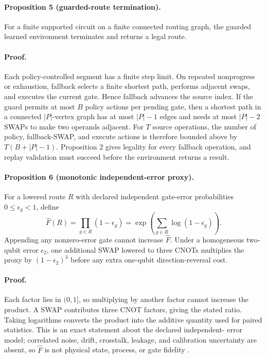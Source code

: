 \documentclass[conference]{IEEEtran}
\begin{document}
\paragraph{Proposition 5 (guarded-route termination).}
For a finite supported circuit on a finite connected routing graph, the
guarded learned environment terminates and returns a legal route.

\paragraph{Proof.}
Each policy-controlled segment has a finite step limit. On repeated
nonprogress or exhaustion, fallback selects a finite shortest path, performs
adjacent swaps, and executes the current gate. Hence fallback advances the
source index. If the guard permits at most $B$ policy actions per pending gate,
then a shortest path in a connected $|P|$-vertex graph has at most $|P|-1$
edges and needs at most $|P|-2$ SWAPs to make two operands adjacent. For $T$
source operations, the number of policy, fallback-SWAP, and execute actions is
therefore bounded above by $T(B+|P|-1)$. Proposition 2 gives legality for every
fallback operation, and replay validation must succeed before the environment
returns a result.

\paragraph{Proposition 6 (monotonic independent-error proxy).}
For a lowered route $R$ with declared independent gate-error probabilities
$0\leq\epsilon_g<1$, define
{\large
\begin{equation}
 \widehat F(R)=\prod_{g\in R}(1-\epsilon_g)
 =\exp\!\left(\sum_{g\in R}\log(1-\epsilon_g)\right).
 \label{eq:fidelity-proxy}
\end{equation}
}
Appending any nonzero-error gate cannot increase $\widehat F$. Under a
homogeneous two-qubit error $\epsilon_2$, one additional SWAP lowered to three
CNOTs multiplies the proxy by $(1-\epsilon_2)^3$ before any extra one-qubit
direction-reversal cost.

\paragraph{Proof.}
Each factor lies in $(0,1]$, so multiplying by another factor cannot increase
the product. A SWAP contributes three CNOT factors, giving the stated ratio.
Taking logarithms converts the product into the additive quantity used for
paired statistics. This is an exact statement about the declared independent-
error model; correlated noise, drift, crosstalk, leakage, and calibration
uncertainty are absent, so $\widehat F$ is not physical state, process, or gate
fidelity \cite{nielsen2002fidelity,gilchrist2005distance}.
\end{document}
